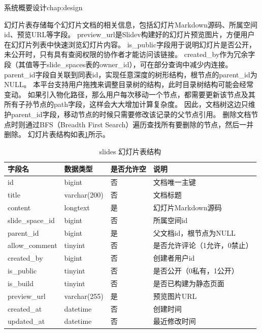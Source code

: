 \begin{cuzchapter}{系统概要设计}{chap:design}
\begin{enumerate}
    幻灯片表存储每个幻灯片文档的相关信息，包括幻灯片Markdown源码、所属空间id、预览URL等字段。
    preview\_url是Slidev构建好的幻灯片预览图片，方便用户在幻灯片列表中快速浏览幻灯片内容。
    is\_public字段用于说明幻灯片是否公开，未公开时，只有具有查阅权限的协作者才能访问该链接。
    created\_by作为冗余字段（其值等于slide\_spaces表的owner\_id），可在部分查询中减少内连接。
    parent\_id字段自关联到同表id，实现任意深度的树形结构，根节点的parent\_id为NULL。
    本平台支持用户拖拽来调整目录树的结构，此时目录树结构可能会经常变动。
    如果引入物化路径，那么用户每次移动一个节点，都需要更新该节点及其所有子孙节点的path字段，这样会大大增加计算复杂度。
    因此，文档树这边只维护parent\_id字段，移动节点的时候只需要修改该记录的父节点引用。
    删除文档节点时则通过BFS（Breadth First Search）遍历查找所有要删除的节点，然后一并删除。
    幻灯片表结构如表\ref{tab:slides}所示。  
    \begin{table}[htbp]
        \centering
        \caption{slides 幻灯片表结构}
        \label{tab:slides}
        \begin{tabular}{llll}
            \toprule
            字段名              & 数据类型         & 是否允许空 & 说明              \\
            \midrule
            id               & bigint       & 否     & 文档唯一主键          \\
            title            & varchar(200) & 否     & 文档标题            \\
            content          & longtext     & 是     & 幻灯片Markdown源码   \\
            slide\_space\_id & bigint       & 否     & 所属空间id          \\
            parent\_id       & bigint       & 是     & 父文档id，根节点为NULL  \\
            allow\_comment   & tinyint      & 否     & 是否允许评论（1允许，0禁止） \\
            created\_by      & bigint       & 否     & 创建者用户id         \\
            is\_public       & tinyint      & 否     & 是否公开（0私有，1公开）   \\
            is\_build        & tinyint      & 否     & 是否已构建为静态页面       \\
            preview\_url     & varchar(255) & 是     & 预览图片URL         \\
            created\_at      & datetime     & 否     & 创建时间            \\
            updated\_at      & datetime     & 否     & 最近修改时间          \\
            \bottomrule
        \end{tabular}
    \end{table}


\end{enumerate}
\end{cuzchapter}
